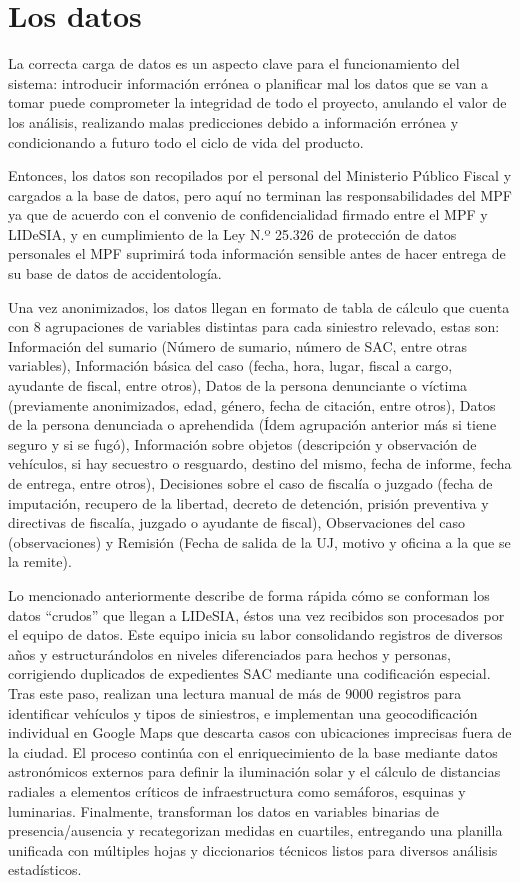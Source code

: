 \section{Los datos}\label{los-datos}

La correcta carga de datos es un aspecto clave para el funcionamiento del sistema: introducir información errónea o planificar mal los datos que se van a tomar puede comprometer la integridad de todo el proyecto, anulando el valor de los análisis, realizando malas predicciones debido a información errónea y condicionando a futuro todo el ciclo de vida del producto.

Entonces, los datos son recopilados por el personal del Ministerio Público Fiscal y cargados a la base de datos, pero aquí no terminan las responsabilidades del MPF ya que de acuerdo con el convenio de confidencialidad firmado entre el MPF y LIDeSIA, y en cumplimiento de la Ley N.º 25.326 de protección de datos personales el MPF suprimirá toda información sensible antes de hacer entrega de su base de datos de accidentología.

Una vez anonimizados, los datos llegan en formato de tabla de cálculo que cuenta con 8 agrupaciones de variables distintas para cada siniestro relevado, estas son: Información del sumario (Número de sumario, número de SAC, entre otras variables), Información básica del caso (fecha, hora, lugar, fiscal a cargo, ayudante de fiscal, entre otros), Datos de la persona denunciante o víctima (previamente anonimizados, edad, género, fecha de citación, entre otros), Datos de la persona denunciada o aprehendida (Ídem agrupación anterior más si tiene seguro y si se fugó), Información sobre objetos (descripción y observación de vehículos, si hay secuestro o resguardo, destino del mismo, fecha de informe, fecha de entrega, entre otros), Decisiones sobre el caso de fiscalía o juzgado (fecha de imputación, recupero de la libertad, decreto de detención, prisión preventiva y directivas de fiscalía, juzgado o ayudante de fiscal), Observaciones del caso (observaciones) y Remisión (Fecha de salida de la UJ, motivo y oficina a la que se la remite).

Lo mencionado anteriormente describe de forma rápida cómo se conforman los datos ``crudos'' que llegan a LIDeSIA, éstos una vez recibidos son procesados por el equipo de datos. Este equipo inicia su labor consolidando registros de diversos años y estructurándolos en niveles diferenciados para hechos y personas, corrigiendo duplicados de expedientes SAC mediante una codificación especial. Tras este paso, realizan una lectura manual de más de \num{9000} registros para identificar vehículos y tipos de siniestros, e implementan una geocodificación individual en Google Maps que descarta casos con ubicaciones imprecisas fuera de la ciudad. El proceso continúa con el enriquecimiento de la base mediante datos astronómicos externos para definir la iluminación solar y el cálculo de distancias radiales a elementos críticos de infraestructura como semáforos, esquinas y luminarias. Finalmente, transforman los datos en variables binarias de presencia/ausencia y recategorizan medidas en cuartiles, entregando una planilla unificada con múltiples hojas y diccionarios técnicos listos para diversos análisis estadísticos.

